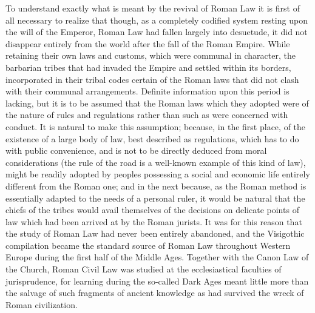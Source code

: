 \documentclass{book}
\begin{document}
To understand exactly what is meant by the revival of Roman Law it is first of all necessary to realize that though, as a completely codified system resting upon the will of the Emperor, Roman Law had fallen largely into desuetude, it did not disappear entirely from the world after the fall of the Roman Empire. While retaining their own laws and customs, which were communal in character, the barbarian tribes that had invaded the Empire and settled within its borders, incorporated in their tribal codes certain of the Roman laws that did not clash with their communal arrangements. Definite information upon this period is lacking, but it is to be assumed that the Roman laws which they adopted were of the nature of rules and regulations rather than such as were concerned with conduct. It is natural to make this assumption; because, in the first place, of the existence of a large body of law, best described as regulations, which has to do with public convenience, and is not to be directly deduced from moral considerations (the rule of the road is a well-known example of this kind of law), might be readily adopted by peoples possessing a social and economic life entirely different from the Roman one; and in the next because, as the Roman method is essentially adapted to the needs of a personal ruler, it would be natural that the chiefs of the tribes would avail themselves of the decisions on delicate points of law which had been arrived at by the Roman jurists. It was for this reason that the study of Roman Law had never been entirely abandoned, and the Visigothic compilation became the standard source of Roman Law throughout Western Europe during the first half of the Middle Ages. Together with the Canon Law of the Church, Roman Civil Law was studied at the ecclesiastical faculties of jurisprudence, for learning during the so-called Dark Ages meant little more than the salvage of such fragments of ancient knowledge as had survived the wreck of Roman civilization.\footnotemark[1]
\end{document}

